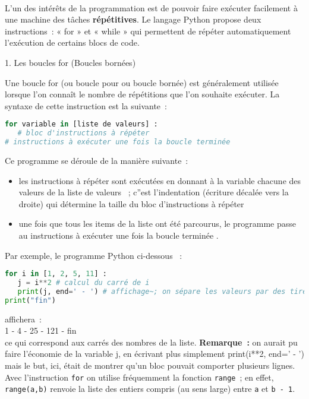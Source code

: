 
\\
L'un des intérêts de la programmation est de pouvoir faire exécuter facilement à une machine des tâches \textbf{répétitives}.
\newpar
Le langage Python propose deux instructions~: « for » et « while » qui permettent de répéter automatiquement l'exécution de certains blocs de code.
\begin{h2}1. Les boucles \og for \fg{} (Boucles bornées) \end{h2}
Une boucle \og for \fg{} (ou boucle \og pour \fg{} ou boucle bornée) est généralement utilisée lorsque l'on connaît le nombre de répétitions que l'on souhaite exécuter.
\newpar
La syntaxe de cette instruction est la suivante~:
\begin{lstlisting}[language=Python]
for variable in [liste de valeurs] :
   # bloc d'instructions à répéter
# instructions à exécuter une fois la boucle terminée
\end{lstlisting}
Ce programme se déroule de la manière suivante~:
\begin{itemize}
     \item
     les \og instructions à répéter \fg{} sont exécutées en donnant à la \og variable \fg{} chacune des valeurs de la \og liste de valeurs \fg{}~; c''est l'indentation (écriture décalée vers la droite) qui détermine la taille du bloc d'instructions à répéter
     \item
     une fois que tous les items de la liste ont été parcourus, le programme passe au \og instructions à exécuter une fois la boucle terminée \fg{}.
\end{itemize}
Par exemple, le programme Python ci-dessous ~:
\begin{lstlisting}[language=Python]
for i in [1, 2, 5, 11] :
   j = i**2 # calcul du carré de i
   print(j, end=' - ') # affichage~; on sépare les valeurs par des tirets 
print("fin") 
\end{lstlisting}
affichera~:\\
1 - 4 - 25 - 121 - fin\\
ce qui correspond aux carrés des nombres de la liste.
\newpar
\textbf{Remarque~: } on aurait pu faire l'économie de la variable j, en écrivant plus simplement \og print(i**2, end=' - ') \fg{} mais le but, ici, était de montrer qu'un bloc pouvait comporter plusieurs lignes.
\newpar
Avec l'instruction \texttt{for} on utilise fréquemment la fonction \texttt{range}~;
en effet, \texttt{range(a,b)} renvoie la liste des entiers compris (au sens large) entre \texttt{a} et \texttt{b - 1}.
